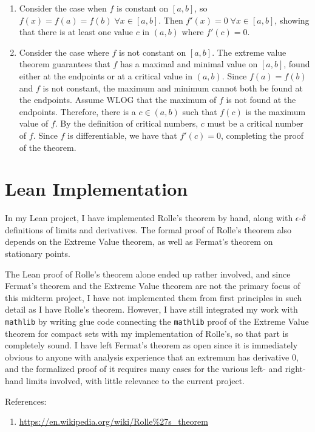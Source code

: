 \documentclass[12pt]{article}
\begin{document}
\begin{enumerate}
    \item Consider the case when $f$ is constant on $[a,b]$, so $f(x) = f(a) = f(b) \; \forall x \in [a,b]$. Then $f'(x) = 0 \; \forall x \in [a,b]$, showing that there is at least one value $c$ in $(a,b)$ where $f'(c)= 0$. 
    \item Consider the case where $f$ is not constant on $[a,b]$. The extreme value theorem guarantees that $f$ has a maximal and minimal value on $[a,b]$, found either at the endpoints or at a critical value in $(a,b)$. Since $f(a) = f(b)$ and $f$ is not constant, the maximum and minimum cannot both be found at the endpoints. Assume WLOG that the maximum of $f$ is not found at the endpoints. Therefore, there is a $c \in (a,b)$ such that $f(c)$ is the maximum value of $f$. By the definition of critical numbers, $c$ must be a critical number of $f$. Since $f$ is differentiable, we have that $f'(c)=  0$, completing the proof of the theorem.
\end{enumerate}

\section{Lean Implementation}

In my Lean project, I have implemented Rolle's theorem by hand, along with $\epsilon$-$\delta$ definitions of limits and derivatives. The formal proof of Rolle's theorem also depends on the Extreme Value theorem, as well as Fermat's theorem on stationary points.

The Lean proof of Rolle's theorem alone ended up rather involved, and since Fermat's theorem and the Extreme Value theorem are not the primary focus of this midterm project, I have not implemented them from first principles in such detail as I have Rolle's theorem. However, I have still integrated my work with \texttt{mathlib} by writing glue code connecting the \texttt{mathlib} proof of the Extreme Value theorem for compact sets with my implementation of Rolle's, so that part is completely sound. I have left Fermat's theorem as open since it is immediately obvious to anyone with analysis experience that an extremum has derivative 0, and the formalized proof of it requires many cases for the various left- and right-hand limits involved, with little relevance to the current project.

\newpage
References:
\begin{enumerate}
\item \url{https://en.wikipedia.org/wiki/Rolle\%27s\_theorem}
\end{enumerate}
\end{document}
